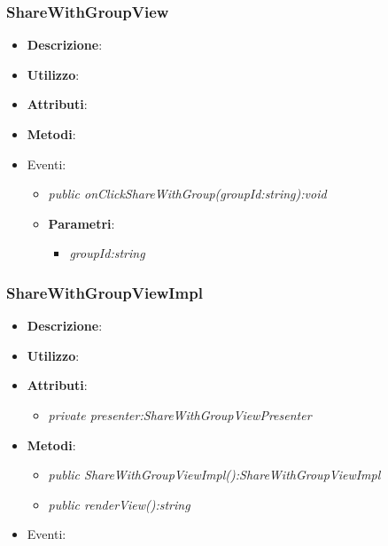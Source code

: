 \subsubsection{ShareWithGroupView}
\begin{itemize}
\item \textbf{Descrizione}: 
\item \textbf{Utilizzo}:
\item \textbf{Attributi}: 
\item \textbf{Metodi}:
\item{Eventi}:
	\begin{itemize}
	\item \textit{public onClickShareWithGroup(groupId:string):void}\\

			\item{\textbf{Parametri}: \begin{itemize}
			\item \textit{groupId:string}\\

			\end{itemize}}
	\end{itemize}
\end{itemize}

\subsubsection{ShareWithGroupViewImpl}
\begin{itemize}
\item \textbf{Descrizione}: 
\item \textbf{Utilizzo}:
\item \textbf{Attributi}:
	\begin{itemize}
	\item \textit{private presenter:ShareWithGroupViewPresenter}\\
	
	\end{itemize} 
\item \textbf{Metodi}:
	\begin{itemize}
	\item \textit{public ShareWithGroupViewImpl():ShareWithGroupViewImpl}\\
	
	\item \textit{public renderView():string}\\

	\end{itemize}
\item{Eventi}:
\end{itemize}

